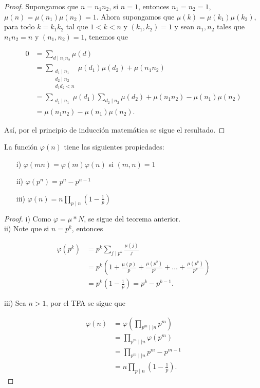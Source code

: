 \begin{proof}

Supongamos que $n=n_1n_2$, si $n=1$, entonces $n_1=n_2=1$, $\mu(n)=\mu(n_1)\mu(n_2)=1$. Ahora supongamos que $\mu(k)=\mu(k_1)\mu(k_2)$, para todo $k=k_1k_2$ tal que $1<k<n$ y $(k_1,k_2)=1$ y sean $n_1,n_2$ tales que $n_1n_2=n$ y $(n_1,n_2)=1$, tenemos que

\begin{align*}
    0&=\sum_{d\mid n_1n_2}\mu(d)\\
    &=\sum_{\substack{d_1\mid n_1\\ d_2\mid n_2\\d_1d_2<n}}\mu(d_1)\mu(d_2)+\mu(n_1n_2)\\
    &=\sum_{\substack{d_1\mid n_1}}\mu(d_1)\sum_{d_2\mid n_2}\mu(d_2)+\mu(n_1n_2)-\mu(n_1)\mu(n_2)\\
    &=\mu(n_1n_2)-\mu(n_1)\mu(n_2)
.\end{align*}

Así, por el principio de inducción matemática se sigue el resultado.
\end{proof}

\begin{corollary}
La función $\varphi(n)$ tiene las siguientes propiedades:

\begin{itemize}
\item[i)] $\varphi(mn)=\varphi(m)\varphi(n)$ si $(m,n)=1$

\item[ii)] $\varphi(p^n)=p^n-p^{n-1}$

\item[iii)] $\varphi(n)=n\displaystyle\prod_{p\mid n}\left(1-\frac{1}{p}\right)  $
\end{itemize}
\end{corollary}

\begin{proof}

i) Como $\varphi=\mu* N$, se sigue del teorema anterior.\\

ii) Note que si $n=p^k$, entonces

\begin{align*}
    \varphi(p^k)&=p^k\sum_{j\mid p^k}\frac{\mu(j)}{j}\\
    &=p^k\left(1+\frac{\mu(p)}{p}+\frac{\mu(p^2)}{p^2}+\ldots+\frac{\mu(p^k)}{p^k}\right)\\
    &=p^k \left(1-\frac{1}{p}\right)=p^k-p^{k-1}
.\end{align*}

iii) Sea $n>1$, por el TFA se sigue que

\begin{align*}
    \varphi(n)&= \varphi \left( \prod_{p^m\mid\mid n}p^m \right)\\
    &= \prod_{p^m\mid\mid n}\varphi(p^m)\\
    &=  \prod_{p^m\mid\mid n} p^m-p^{m-1}\\
    &=n \prod_{p\mid n}\left( 1-\frac{1}{p} \right)
.\end{align*}
\end{proof}

